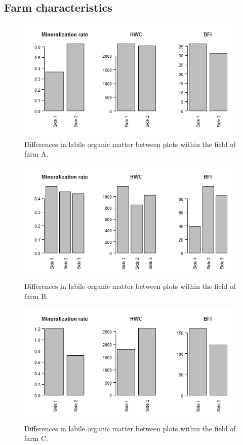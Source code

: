 \documentclass[10pt,twoside,dutch,english]{report}
\begin{document}
\begin{appendices}
  
  
\chapter{Farm characteristics}
	\label{chap: Farm characteristics}
	\begin{figure}[ht] %
		\centering
		\includegraphics[width=0.7\linewidth]{app_het_F1}
		\caption{Differences in labile organic matter between plots within the field of farm A.}
			\end{figure}
	\begin{figure}[ht] %
		\centering
		\includegraphics[width=0.7\linewidth]{app_het_F2}
		\caption{Differences in labile organic matter between plots within the field of farm B.}
			\end{figure}
	\begin{figure}[ht] %
		\centering
		\includegraphics[width=0.7\linewidth]{app_het_F3}
		\caption{Differences in labile organic matter between plots within the field of farm C.}

\end{figure}
\end{appendices}
\end{document}
